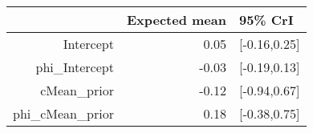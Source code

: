 \begin{tabular}{rrl}
  \hline
 & Expected mean & 95\% CrI \\ 
  \hline
Intercept & 0.05 & [-0.16,0.25] \\ 
  phi\_Intercept & -0.03 & [-0.19,0.13] \\ 
  cMean\_prior & -0.12 & [-0.94,0.67] \\ 
  phi\_cMean\_prior & 0.18 & [-0.38,0.75] \\ 
   \hline
\end{tabular}

